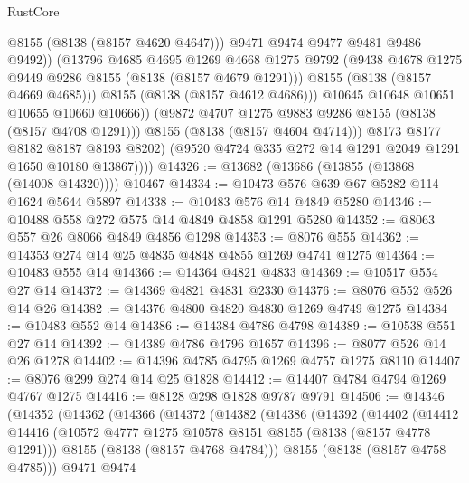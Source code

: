 \begin{lexlean}{RustCore}
\begin{coremodule}
                          @8155
                          (@8138 (@8157 @4620 @4647)))
                        @9471
                        @9474
                        @9477
                        @9481
                        @9486
                        @9492))
                    (@13796
                      @4685
                      @4695
                      @1269
                      @4668
                      @1275
                      @9792
                      (@9438 @4678 @1275 @9449 @9286 @8155 (@8138 (@8157 @4679 @1291)))
                      @8155
                      (@8138 (@8157 @4669 @4685)))
                    @8155
                    (@8138 (@8157 @4612 @4686)))
                  @10645
                  @10648
                  @10651
                  @10655
                  @10660
                  @10666))
              (@9872 @4707 @1275 @9883 @9286 @8155 (@8138 (@8157 @4708 @1291)))
              @8155
              (@8138 (@8157 @4604 @4714)))
            @8173
            @8177
            @8182
            @8187
            @8193
            @8202)
          (@9520 @4724 @335 @272 @14 @1291 @2049 @1291 @1650 @10180 @13867))))
@14326 := @13682 (@13686 (@13855 (@13868 (@14008 @14320)))) @10467
@14334 := @10473 @576 @639 @67 @5282 @114 @1624 @5644 @5897
@14338 := @10483 @576 @14 @4849 @5280
@14346 := @10488 @558 @272 @575 @14 @4849 @4858 @1291 @5280
@14352 := @8063 @557 @26 @8066 @4849 @4856 @1298
@14353 := @8076 @555
@14362 := @14353 @274 @14 @25 @4835 @4848 @4855 @1269 @4741 @1275
@14364 := @10483 @555 @14
@14366 := @14364 @4821 @4833
@14369 := @10517 @554 @27 @14
@14372 := @14369 @4821 @4831 @2330
@14376 := @8076 @552 @526 @14 @26
@14382 := @14376 @4800 @4820 @4830 @1269 @4749 @1275
@14384 := @10483 @552 @14
@14386 := @14384 @4786 @4798
@14389 := @10538 @551 @27 @14
@14392 := @14389 @4786 @4796 @1657
@14396 := @8077 @526 @14 @26 @1278
@14402 := @14396 @4785 @4795 @1269 @4757 @1275 @8110
@14407 := @8076 @299 @274 @14 @25 @1828
@14412 := @14407 @4784 @4794 @1269 @4767 @1275
@14416 := @8128 @298 @1828 @9787 @9791
@14506 := @14346
    (@14352
      (@14362
        (@14366
          (@14372
            (@14382
              (@14386
                (@14392
                  (@14402
                    (@14412
                      @14416
                      (@10572 @4777 @1275 @10578 @8151 @8155 (@8138 (@8157 @4778 @1291)))
                      @8155
                      (@8138 (@8157 @4768 @4784)))
                    @8155
                    (@8138 (@8157 @4758 @4785)))
                  @9471
                  @9474

\end{coremodule}
\end{lexlean}
